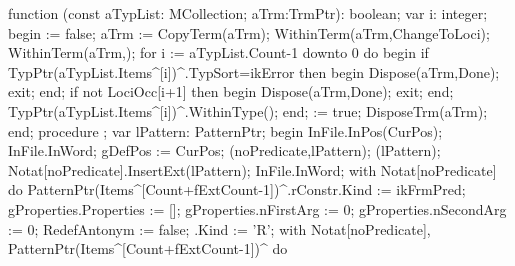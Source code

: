 function (const aTypList: MCollection; aTrm:TrmPtr): boolean;
var
   i: integer;
begin
    := false;
   aTrm := CopyTerm(aTrm);
   WithinTerm(aTrm,ChangeToLoci);
   WithinTerm(aTrm,);
   for i := aTypList.Count-1 downto 0 do
   begin
      if TypPtr(aTypList.Items^[i])^.TypSort=ikError then
      begin
         Dispose(aTrm,Done);
         exit;
      end;
      if not LociOcc[i+1] then
      begin
         Dispose(aTrm,Done);
         exit;
      end;
      TypPtr(aTypList.Items^[i])^.WithinType();
   end;
    := true;
   DisposeTrm(aTrm);
end;
\eatline
{}\nwendcode{}\nwdocspar
\nwenddocs{}\endmoddef\nwstartdeflinemarkup{}\nwenddeflinemarkup
procedure ;
var
   lPattern: PatternPtr;
begin
   InFile.InPos(CurPos);
   InFile.InWord;
   gDefPos := CurPos;
   (noPredicate,lPattern);
   (lPattern);
   Notat[noPredicate].InsertExt(lPattern);
   InFile.InWord;
   with Notat[noPredicate] do
      PatternPtr(Items^[Count+fExtCount-1])^.rConstr.Kind := ikFrmPred;
   gProperties.Properties := [];
   gProperties.nFirstArg := 0;
   gProperties.nSecondArg := 0;
   RedefAntonym := false;
   .Kind := 'R';
   with Notat[noPredicate], PatternPtr(Items^[Count+fExtCount-1])^ do
